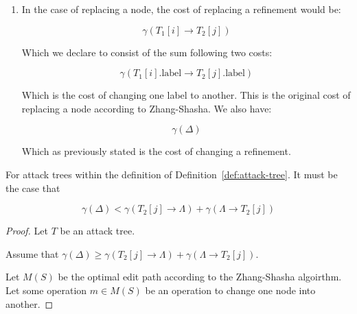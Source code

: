 \begin{definition}
\begin{enumerate}
      \item In the case of replacing a node, the cost of replacing a refinement would be:

$$\gamma({T_1[i]} \rightarrow {T_2[j]})$$

Which we declare to consist of the sum following two costs:

$$\gamma({T_1[i].\text{label}} \rightarrow {T_2[j].\text{label}})$$

Which is the cost of changing one label to another. This is the original cost of replacing a node according to Zhang-Shasha. We also have:

$$\gamma(\Delta)$$

Which as previously stated is the cost of changing a refinement.



\end{enumerate}

\end{definition}


\begin{lemma}
For attack trees within the definition of Definition~\ref{def:attack-tree}. It must be the case that

\[\gamma(\Delta) < \gamma(T_2[j] \rightarrow {\Lambda}) + \gamma(\Lambda \rightarrow {T_2[j]})\]

\begin{proof}
Let $T$ be an attack tree.

Assume that $\gamma(\Delta) \geq \gamma(T_2[j] \rightarrow {\Lambda}) + \gamma(\Lambda \rightarrow {T_2[j]})$.

Let $M(S)$ be the optimal edit path according to the Zhang-Shasha algoirthm. Let some operation $m \in M(S)$ be an operation to change one node into another.
\end{proof}


\end{lemma}






